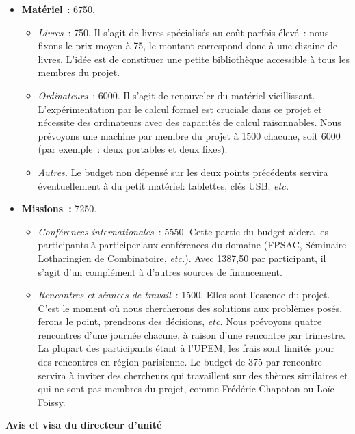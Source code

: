 \documentclass[10pt,reqno]{amsart}
\numberwithin{equation}{subsection}
\begin{document}
\begin{itemize}
    \item {\bf Matériel}~: 6750\texteuro.
    \begin{itemize}
        \item {\em Livres}~: 750\texteuro.
        Il s'agit de livres spécialisés au coût parfois élevé~: nous
        fixons le prix moyen à 75\texteuro, le montant correspond donc
        à une dizaine de livres. L'idée est de constituer une petite
        \og bibliothèque \fg{} accessible à tous les membres du projet.

        \item {\em Ordinateurs}~: 6000\texteuro.
        Il s'agit de renouveler du matériel vieillissant.
        L'expérimentation par le calcul formel est cruciale dans ce
        projet et nécessite des ordinateurs avec des capacités de calcul
        raisonnables. Nous prévoyons une machine par membre du projet à
        1500\texteuro{} chacune, soit 6000\texteuro{} (par exemple~:
        deux portables et deux fixes).

        \item {\em Autres.}
        Le budget non dépensé sur les deux points précédents servira
        éventuellement à du petit matériel: tablettes, clés USB, {\em etc.}
    \end{itemize}

    \item {\bf Missions~:} 7250\texteuro.
    \begin{itemize}
        \item {\em Conférences internationales}~: 5550\texteuro.
        Cette partie du budget aidera les participants à participer aux
        conférences du domaine (FPSAC, Séminaire Lotharingien de
        Combinatoire, {\em etc.}). Avec 1387,50\texteuro{} par participant,
        il s'agit d'un complément à d'autres sources de financement.

        \item {\em Rencontres et séances de travail}~: 1500\texteuro.
        Elles sont l'essence du projet. C'est le moment où nous
        chercherons des solutions aux problèmes posés, ferons le point,
        prendrons des décisions, {\em etc.} Nous prévoyons quatre
        rencontres d'une journée chacune, à raison d'une rencontre par
        trimestre. La plupart des participants étant à l'UPEM, les frais
        sont limités pour des rencontres en région parisienne. Le budget
        de 375\texteuro{} par rencontre servira à inviter des chercheurs
        qui travaillent sur des thèmes similaires et qui ne sont pas
        membres du projet, comme Frédéric Chapoton ou Loïc Foissy.
    \end{itemize}
\end{itemize}



\bigskip

\Large{\bf{Avis et visa du directeur d’unité}}
\bigskip
\end{document}

